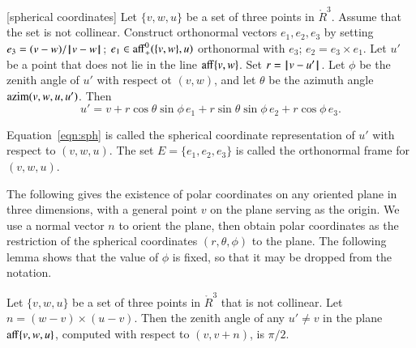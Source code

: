\begin{lemma}[spherical coordinates]\label{lemma:sph}
Let $\{v,w,u\}$ be a set of three points in $\ring{R}^3$.
Assume that the set is not collinear.  
Construct orthonormal vectors  $e_1,e_2,e_3$ by setting
$e_3 = (v-w)/{\hskip0.1em|\hskip-0.15em|\hskip0.1em}v - w{\hskip0.1em|\hskip-0.15em|\hskip0.1em}$; 
$e_1\in{\operatorname{aff}}_+^0(\{v,w\},u)$ orthonormal with $e_3$;
$e_2 = e_3\times e_1$.
Let $u'$ be a point that does not
lie in the line ${\operatorname{aff}}\{v,w\}$.
Set $r = {\hskip0.1em|\hskip-0.15em|\hskip0.1em}v  -  u'{\hskip0.1em|\hskip-0.15em|\hskip0.1em}$. Let
$\phi$ be the zenith angle of $u'$ with respect ot $(v,w)$, and let
$\theta$ be the azimuth angle ${\operatorname{azim}}(v,w,u,u')$.  Then
   \begin{equation}
   u' = v + r \cos\theta \sin\phi\, e_1 + r \sin\theta\sin\phi\, e_2 +
   r\cos\phi\,e_3.
   \label{eqn:sph}
   \end{equation}
\end{lemma}

\begin{definition}[frame]\label{def:sph}
Equation~\ref{eqn:sph} is called the spherical coordinate representation of
$u'$ with respect to $(v,w,u)$.  The set $E=\{e_1,e_2,e_3\}$ is called
the orthonormal frame for $(v,w,u)$.  
\end{definition}

The following gives the existence of polar coordinates on any oriented
plane in three dimensions, with a general point $v$ on the plane
serving as the origin.  We use a normal vector $n$ to orient the plane,
then obtain polar coordinates as the restriction of the
spherical coordinates $(r,\theta,\phi)$ to the plane.
The following lemma shows that the value of $\phi$ is fixed, so that
it may be dropped from the notation.

\begin{lemma}\label{lemma:polar-gen}
Let $\{v,w,u\}$ be a set of three points in $\ring{R}^3$
that is not collinear.
Let $n = (w-v) \times (u-v)$.
Then the zenith angle of any $u'\ne v$ in the plane ${\operatorname{aff}}\{v,w,u\}$,
computed with respect to $(v,v+n)$,
is $\pi/2$.
\end{lemma}

